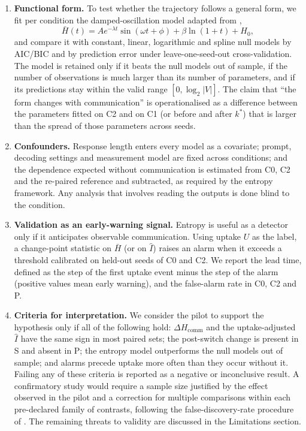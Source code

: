 \begin{enumerate}
  \item \textbf{Functional form.} To test whether the trajectory follows a general form, we fit per condition the damped-oscillation model adapted from \textcite{zhu2026orchestrator},
  \begin{equation}
    \bar{H}(t) = A e^{-\lambda t} \sin(\omega t + \phi) + \beta \ln(1 + t) + H_0,
    \label{eq:zhu}
  \end{equation}
  and compare it with constant, linear, logarithmic and spline null models by AIC/BIC and by prediction error under leave-one-seed-out cross-validation. The model is retained only if it beats the null models out of sample, if the number of observations is much larger than its number of parameters, and if its predictions stay within the valid range $[0, \log_2 |V|]$. The claim that ``the form changes with communication'' is operationalised as a difference between the parameters fitted on C2 and on C1 (or before and after $k^{*}$) that is larger than the spread of those parameters across seeds.

  \item \textbf{Confounders.} Response length enters every model as a covariate; prompt, decoding settings and measurement model are fixed across conditions; and the dependence expected without communication is estimated from C0, C2 and the re-paired reference and subtracted, as required by the entropy framework. Any analysis that involves reading the outputs is done blind to the condition.

  \item \textbf{Validation as an early-warning signal.} Entropy is useful as a detector only if it anticipates observable communication. Using uptake $U$ as the label, a change-point statistic on $\bar{H}$ (or on $\hat{I}$) raises an alarm when it exceeds a threshold calibrated on held-out seeds of C0 and C2. We report the lead time, defined as the step of the first uptake event minus the step of the alarm (positive values mean early warning), and the false-alarm rate in C0, C2 and P.

  \item \textbf{Criteria for interpretation.} We consider the pilot to support the hypothesis only if all of the following hold: $\Delta H_{\mathrm{comm}}$ and the uptake-adjusted $\hat{I}$ have the same sign in most paired sets; the post-switch change is present in S and absent in P; the entropy model outperforms the null models out of sample; and alarms precede uptake more often than they occur without it. Failing any of these criteria is reported as a negative or inconclusive result. A confirmatory study would require a sample size justified by the effect observed in the pilot and a correction for multiple comparisons within each pre-declared family of contrasts, following the false-discovery-rate procedure of \textcite{benjamini1995fdr}. The remaining threats to validity are discussed in the Limitations section.
\end{enumerate}

